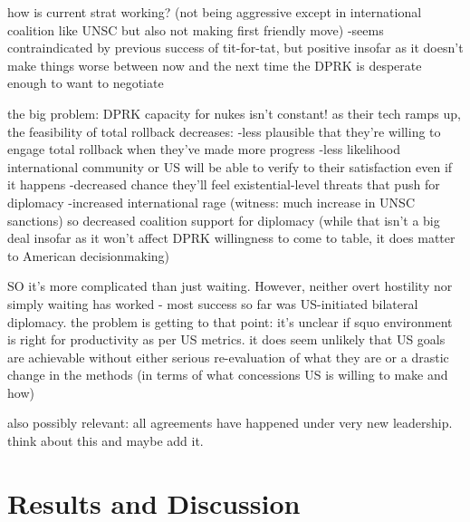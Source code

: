 \documentclass{article}
\begin{document}
how is current strat working? (not being aggressive except in international coalition like UNSC but also not making first friendly move)
	-seems contraindicated by previous success of tit-for-tat, but positive insofar as it doesn't make things worse between now and the next time the DPRK is desperate enough to want to negotiate

the big problem: DPRK capacity for nukes isn't constant! as their tech ramps up, the feasibility of total rollback decreases:
	-less plausible that they're willing to engage total rollback when they've made more progress
	-less likelihood international community or US will be able to verify to their satisfaction even if it happens
	-decreased chance they'll feel existential-level threats that push for diplomacy
	-increased international rage (witness: much increase in UNSC sanctions) so decreased coalition support for diplomacy (while that isn't a big deal insofar as it won't affect DPRK willingness to come to table, it does matter to American decisionmaking)

SO it's more complicated than just waiting. However, neither overt hostility nor simply waiting has worked - most success so far was US-initiated bilateral diplomacy. the problem is getting to that point: it's unclear if squo environment is right for productivity as per US metrics. it does seem unlikely that US goals are achievable without either serious re-evaluation of what they are or a drastic change in the methods (in terms of what concessions US is willing to make and how)

also possibly relevant: all agreements have happened under very new leadership. think about this and maybe add it.
\section{Results and Discussion}

\end{document}
